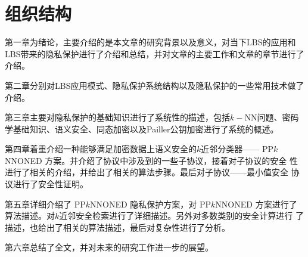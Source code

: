 \section{组织结构}
第一章为绪论，主要介绍的是本文章的研究背景以及意义，对当下LBS的应用和LBS带来的隐私保护进行了介绍和总结，并对文章的主要工作和文章的章节进行了介绍。


第二章分别对LBS应用模式、隐私保护系统结构以及隐私保护的一些常用技术做了介绍。

第三章主要对隐私保护的基础知识进行了系统性的描述，包括$k-$NN问题、密码学基础知识、语义安全、同态加密以及Pailler公钥加密进行了系统的概述。

第四章着重介绍一种能够满足加密数据上语义安全的$k$近邻分类器——
PP$k$NNONED 方案。并介绍了协议中涉及到的一些子协议，接着对子协议的安全
性进行了相关的介绍，并给出了相关的算法步骤。最后对子协议——最小值安全
协议进行了安全性证明。

第五章详细介绍了 PP$k$NNONED 隐私保护方案，对 PP$k$NNONED 方案进行了
算法描述。对$k$近邻安全检索进行了详细描述。另外对多数类别的安全计算进行
了描述，也给出了相关的算法描述，最后对复杂性进行了分析。

第六章总结了全文，并对未来的研究工作进一步的展望。




